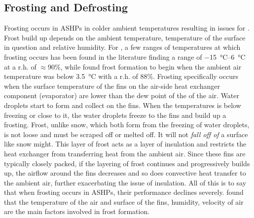 \subsection{Frosting and Defrosting} \label{subsec:defrost}
Frosting occurs in \acp{ASHP} in colder ambient temperatures resulting in issues for \HPs. Frost build up depends on the ambient temperature, temperature of the surface in question and relative humidity. For \HPs, a few ranges of temperatures at which frosting occurs has been found in the literature \cite{sandstrom_frosting_2021} finding a range of \qtyrange{-15}{6}{\celsius} at a r.h. of $\approx$90\%, while \cite{kropas_experimental_2021} found frost formation to begin when the ambient air temperature was below \SI{3.5}{\celsius} with a r.h. of 88\%. Frosting specifically occurs when the surface temperature of the fins on the air-side heat exchanger component (evaporator) are lower than the dew point of the of the air. Water droplets start to form and collect on the fins. When the temperatures is below freezing or close to it, the water droplets freeze to the fins and build up a frosting. Frost, unlike snow, which both form from the freezing of water droplets, is not loose and must be scraped off or melted off. It will not \textit{fall off of} a surface like snow might. This layer of frost acts as a layer of insulation and restricts the heat exchanger from transferring heat from the ambient air. Since these fins are typically closely packed, if the layering of frost continues and progressively builds up, the airflow around the fins decreases and so does convective heat transfer to the ambient air, further exacerbating the issue of insulation. All of this is to say that when frosting occurs in \acp{ASHP}, their performance declines severely. \cite{zhang_experimental_2018} found that the temperature of the air and surface of the fins, humidity, velocity of air are the main factors involved in frost formation. 

